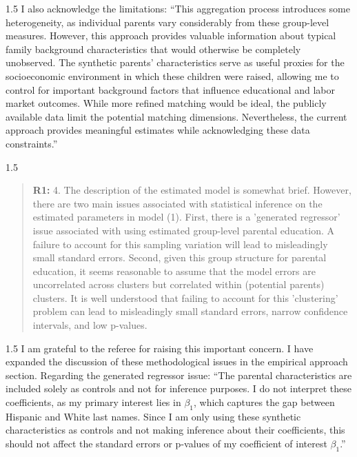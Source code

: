 \documentclass[12pt,english]{article}
\newcommand{\rrxspc}{1.5}
\begin{document}
\begin{refsection}
\begin{spacing}{\rrxspc}
    I also acknowledge the limitations: ``This aggregation process introduces some heterogeneity, as individual parents vary considerably from these group-level measures. However, this approach provides valuable information about typical family background characteristics that would otherwise be completely unobserved. The synthetic parents' characteristics serve as useful proxies for the socioeconomic environment in which these children were raised, allowing me to control for important background factors that influence educational and labor market outcomes. While more refined matching would be ideal, the publicly available data limit the potential matching dimensions. Nevertheless, the current approach provides meaningful estimates while acknowledging these data constraints.''
\end{spacing}

\begin{spacing}{\rrxspc}
    \begin{quotation}
        \textbf{R1: } 4. The description of the estimated model is somewhat brief. However, there are two main issues associated with statistical inference on the estimated parameters in model (1). First, there is a 'generated regressor' issue associated with using estimated group-level parental education. A failure to account for this sampling variation will lead to misleadingly small standard errors. Second, given this group structure for parental education, it seems reasonable to assume that the model errors are uncorrelated across clusters but correlated within (potential parents) clusters. It is well understood that failing to account for this 'clustering' problem can lead to misleadingly small standard errors, narrow confidence intervals, and low p-values.
    \end{quotation}
\end{spacing}

\begin{spacing}{\rrxspc}
    I am grateful to the referee for raising this important concern. I have expanded the discussion of these methodological issues in the empirical approach section. Regarding the generated regressor issue: ``The parental characteristics are included solely as controls and not for inference purposes. I do not interpret these coefficients, as my primary interest lies in $\beta_1$, which captures the gap between Hispanic and White last names. Since I am only using these synthetic characteristics as controls and not making inference about their coefficients, this should not affect the standard errors or p-values of my coefficient of interest $\beta_1$.''


\end{spacing}
\end{refsection}
\end{document}
